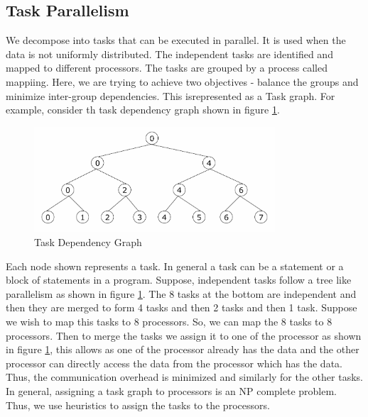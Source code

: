 \documentclass[12pt]{article}
\begin{document}
\subsection{Task Parallelism}
We decompose into tasks that can be executed in parallel. It is used when the data is not uniformly distributed.
The independent tasks are identified and mapped to different processors. The tasks are grouped by a process called mappiing. 
Here, we are trying to achieve two objectives - balance the groups and minimize inter-group dependencies.
This isrepresented as a Task graph. For example, consider th task dependency graph shown in figure 
\ref{fig:task_graph}.
\begin{figure}[H]
    \centering
    \includegraphics[width=0.8\textwidth]{images/task_graph.png}
    \caption{Task Dependency Graph}
    \label{fig:task_graph}
\end{figure}
Each node shown represents a task. In general a task can be a statement or a block of statements in a program. 
Suppose, independent tasks follow a tree like parallelism as shown in figure \ref{fig:task_graph}.
The 8 tasks at the bottom are independent and then they are merged to form 4 tasks and then 2 tasks and then 1 task.
Suppose we wish to map this tasks to 8 processors. So, we can map the 8 tasks to 8 processors. Then to merge the tasks we assign it to one of the 
processor as shown in figure \ref{fig:task_graph}, this allows as one of the processor already has the data and the other processor 
can directly access the data from the processor which has the data. Thus, the communication overhead is minimized and similarly for the other tasks.
In general, assigning a task graph to processors is an NP complete problem. Thus, we use heuristics to assign the tasks to the processors.
\end{document}

